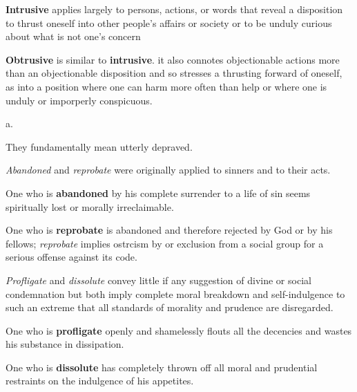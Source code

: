 \begin{description}[style=unboxed]
\begin{mynewitemize}
\item \textbf{Intrusive} applies largely to persons, actions, or words that reveal a
disposition to thrust oneself into other people's affairs or society or to be
unduly curious about what is not one's concern

\item \textbf{Obtrusive} is similar to \textbf{intrusive}. it also connotes objectionable actions
more than an objectionable disposition and so stresses a thrusting forward of
oneself, as into a position where one can harm more often than help or where one
is unduly or imporperly conspicuous.
\end{mynewitemize}


 a.

\begin{mynewitemize}
\item They fundamentally mean utterly depraved. 

\item \textit{Abandoned} and \textit{reprobate} were originally applied to 
sinners and to their acts.

\item One who is \textbf{abandoned} by his complete surrender to a life of sin
seems spiritually lost or morally irreclaimable.

\item One who is \textbf{reprobate} is abandoned and therefore rejected by God
or by his fellows; \textit{reprobate} implies ostrcism by or exclusion from a 
social group for a serious offense against its code.

\item \textit{Profligate} and \textit{dissolute} convey little if any suggestion of divine
or social condemnation but both imply complete moral breakdown and self-indulgence
to such an extreme that all standards of morality and prudence are disregarded.

\item  One who is \textbf{profligate} openly and shamelessly flouts all the decencies 
and wastes his substance in dissipation.

\item One who is \textbf{dissolute} has completely thrown off all moral and 
prudential restraints on the indulgence of his appetites.

\end{mynewitemize}



\end{description}
